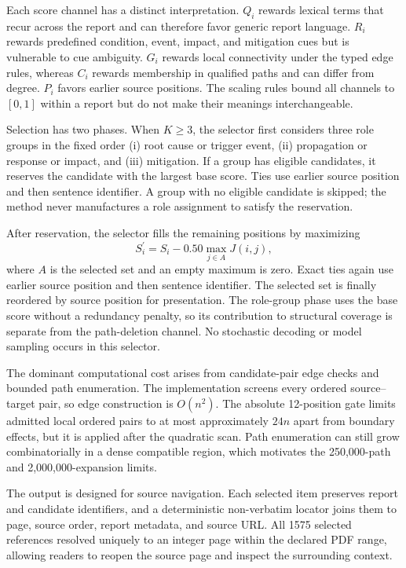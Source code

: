 \documentclass[information,article,submit,moreauthors]{Definitions/mdpi}
\begin{document}
Each score channel has a distinct interpretation. $Q_i$ rewards lexical terms that recur across the report and can therefore favor generic report language. $R_i$ rewards predefined condition, event, impact, and mitigation cues but is vulnerable to cue ambiguity. $G_i$ rewards local connectivity under the typed edge rules, whereas $C_i$ rewards membership in qualified paths and can differ from degree. $P_i$ favors earlier source positions. The scaling rules bound all channels to $[0,1]$ within a report but do not make their meanings interchangeable.

Selection has two phases. When $K\geq3$, the selector first considers three role groups in the fixed order (i) root cause or trigger event, (ii) propagation or response or impact, and (iii) mitigation. If a group has eligible candidates, it reserves the candidate with the largest base score. Ties use earlier source position and then sentence identifier. A group with no eligible candidate is skipped; the method never manufactures a role assignment to satisfy the reservation.

After reservation, the selector fills the remaining positions by maximizing
\begin{equation}
S_i^{\prime}=S_i-0.50\max_{j\in A}J(i,j),
\label{eq:redundancy}
\end{equation}
where $A$ is the selected set and an empty maximum is zero. Exact ties again use earlier source position and then sentence identifier. The selected set is finally reordered by source position for presentation. The role-group phase uses the base score without a redundancy penalty, so its contribution to structural coverage is separate from the path-deletion channel. No stochastic decoding or model sampling occurs in this selector.

The dominant computational cost arises from candidate-pair edge checks and bounded path enumeration. The implementation screens every ordered source--target pair, so edge construction is $O(n^2)$. The absolute 12-position gate limits admitted local ordered pairs to at most approximately $24n$ apart from boundary effects, but it is applied after the quadratic scan. Path enumeration can still grow combinatorially in a dense compatible region, which motivates the 250,000-path and 2,000,000-expansion limits.

The output is designed for source navigation. Each selected item preserves report and candidate identifiers, and a deterministic non-verbatim locator joins them to page, source order, report metadata, and source URL. All 1575 selected references resolved uniquely to an integer page within the declared PDF range, allowing readers to reopen the source page and inspect the surrounding context.
\end{document}
